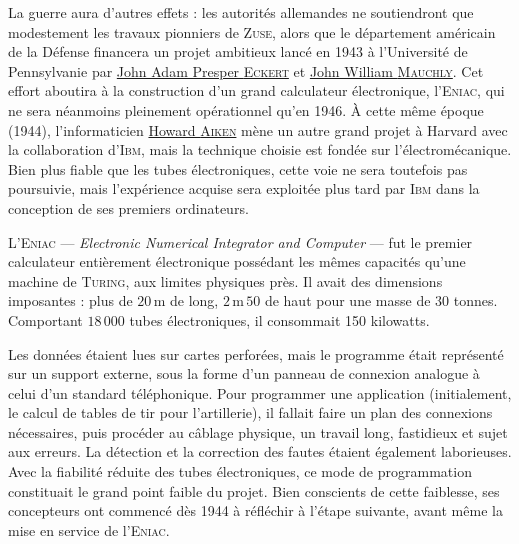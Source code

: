 La guerre aura d’autres effets : les autorités allemandes ne soutiendront que modestement les travaux pionniers de \textsc{Zuse}, alors que le département américain de la Défense financera un projet ambitieux lancé en 1943 à l’Université de Pennsylvanie par \href{https://fr.wikipedia.org/wiki/John_Eckert}{John Adam Presper \textsc{Eckert}} et \href{https://fr.wikipedia.org/wiki/John_William_Mauchly}{John William \textsc{Mauchly}}. Cet effort aboutira à la construction d’un grand calculateur électronique, l’\textsc{Eniac}, qui ne sera néanmoins pleinement opérationnel qu’en 1946. À cette même époque (1944), l'informaticien \href{https://fr.wikipedia.org/wiki/Howard_Aiken}{Howard \textsc{Aiken}} mène un autre grand projet à Harvard avec la collaboration d’\textsc{Ibm}, mais la technique choisie est fondée sur l'électromécanique. Bien plus fiable que les tubes électroniques, cette voie ne sera toutefois pas poursuivie, mais l’expérience acquise sera exploitée plus tard par \textsc{Ibm} dans la conception de ses premiers ordinateurs.

L’\textsc{Eniac} --- \textit{Electronic Numerical Integrator and Computer} --- fut le premier calculateur entièrement électronique possédant les mêmes capacités qu’une machine de \textsc{Turing}, aux limites physiques près. Il avait des dimensions imposantes : plus de $20$\,m de long, $2$\,m\,$50$ de haut pour une masse de $30$ tonnes. Comportant $18\,000$ tubes électroniques, il consommait 150 kilowatts.

Les données étaient lues sur cartes perforées, mais le programme était représenté sur un support externe, sous la forme d’un panneau de connexion analogue à celui d’un standard téléphonique. Pour programmer une application (initialement, le calcul de tables de tir pour l’artillerie), il fallait faire un plan des connexions nécessaires, puis procéder au câblage physique, un travail long, fastidieux et sujet aux erreurs. La détection et la correction des fautes étaient également laborieuses. Avec la fiabilité réduite des tubes électroniques, ce mode de programmation constituait le grand point faible du projet. Bien conscients de cette faiblesse, ses concepteurs ont commencé dès 1944 à réfléchir à l’étape suivante, avant même la mise en service de l’\textsc{Eniac}.

